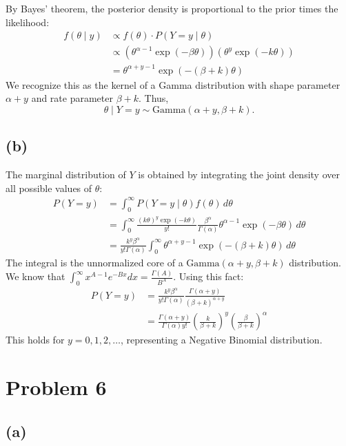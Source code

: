 \documentclass[
  letterpaper,
  DIV=11,
  numbers=noendperiod]{scrartcl}
\begin{document}
By Bayes' theorem, the posterior density is proportional to the prior
times the likelihood: \[
\begin{aligned}
f(\theta \mid y) &\propto f(\theta) \cdot P(Y = y \mid \theta) \\
&\propto \left( \theta^{\alpha - 1} \exp(-\beta \theta) \right) \left( \theta^y \exp(-k\theta) \right) \\
&= \theta^{\alpha + y - 1} \exp(-(\beta + k)\theta)
\end{aligned}
\] We recognize this as the kernel of a Gamma distribution with shape
parameter \(\alpha + y\) and rate parameter \(\beta + k\). Thus, \[
\theta \mid Y = y \sim \text{Gamma}(\alpha + y, \beta + k).
\]

\subsection{(b)}\label{b-3}

The marginal distribution of \(Y\) is obtained by integrating the joint
density over all possible values of \(\theta\): \[
\begin{aligned}
P(Y = y) &= \int_0^\infty P(Y = y \mid \theta) f(\theta) \, d\theta \\
&= \int_0^\infty \frac{(k\theta)^y \exp(-k\theta)}{y!} \frac{\beta^\alpha}{\Gamma(\alpha)} \theta^{\alpha - 1} \exp(-\beta \theta) \, d\theta \\
&= \frac{k^y \beta^\alpha}{y! \Gamma(\alpha)} \int_0^\infty \theta^{\alpha + y - 1} \exp(-(\beta + k)\theta) \, d\theta
\end{aligned}
\] The integral is the unnormalized core of a
\(\text{Gamma}(\alpha + y, \beta + k)\) distribution. We know that
\(\int_0^\infty x^{A-1} e^{-Bx} dx = \frac{\Gamma(A)}{B^A}\). Using this
fact: \[
\begin{aligned}
P(Y = y) &= \frac{k^y \beta^\alpha}{y! \Gamma(\alpha)} \frac{\Gamma(\alpha + y)}{(\beta + k)^{\alpha + y}} \\
&= \frac{\Gamma(\alpha + y)}{\Gamma(\alpha) y!} \left(\frac{k}{\beta + k} \right)^y \left(\frac{\beta}{\beta + k} \right)^{\alpha}
\end{aligned}
\] This holds for \(y = 0, 1, 2, \dots\), representing a Negative
Binomial distribution.

\section{Problem 6}\label{problem-6}

\subsection{(a)}\label{a-4}
\end{document}
